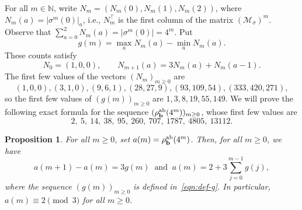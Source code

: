 \documentclass[12pt]{article}
\theoremstyle{plain}
\newtheorem{proposition}[theorem]{Proposition}
\theoremstyle{definition}
\theoremstyle{remark}
\newcommand{\N}{\mathbb{N}}
\numberwithin{equation}{section}
\begin{document}
For all $m\in\N$, write $N_m=(N_m(0),N_m(1),N_m(2))$, where
$N_m(a)=\lvert\sigma^m(0)\rvert_a$, i.e., $N_m^\top$ is the first column of the matrix $(\mathcal{M}_\sigma)^m$. Observe that $\sum_{a=0}^2 N_m(a)=\lvert\sigma^m(0)\rvert=4^m$.
Put
\begin{equation}
\label{eqn:def-g}
g(m)=\max_a N_m(a)-\min_a N_m(a).
\end{equation}
These counts satisfy
\begin{equation}\label{eq:counts}
 N_0=(1,0,0),\qquad
 N_{m+1}(a)=3N_m(a)+N_m(a-1).
\end{equation}
The first few values of the vectors $(N_m)_{m\ge 0}$ are
\[
(1, 0, 0), (3, 1, 0), (9, 6, 1), (28, 27, 9), (93, 109, 54), (333, 420, 271),
\]
so the first few values of $(g(m))_{m\ge 0}$ are $1, 3, 8, 19, 55, 149$.
We will prove the following exact formula for the sequence $(\rho_{\mathbf{b}}^{\rm ab}(4^m))_{m\ge 0}$, whose first few values are
\[
 2,\ 5,\ 14,\ 38,\ 95,\ 260,\ 707,\ 1787,\ 4805,\ 13112.
\]

\begin{proposition}
\label{pro:formula-for-complexity}
For all $m\ge 0$, set $a(m) = \rho_{\mathbf{b}}^{\rm ab}(4^m)$.
Then, for all $m\ge 0$, we have 
$$a(m+1)-a(m)=3g(m) \ \text{ and }\ a(m)=2+3\sum_{j=0}^{m-1}g(j),$$ 
where the sequence $(g(m))_{m\ge 0}$ is defined in~\eqref{eqn:def-g}.
In particular, $a(m)\equiv2\pmod3$ for all $m\ge 0$.
\end{proposition}
\end{document}
